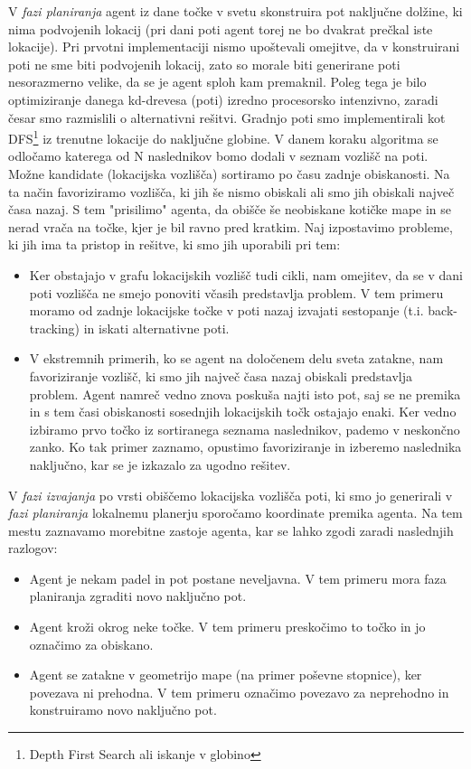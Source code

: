 \documentclass[a4paper,10pt]{article}
\begin{document}
V \textit{fazi planiranja} agent iz dane točke v svetu skonstruira pot naključne dolžine, ki nima podvojenih lokacij (pri dani poti agent torej ne bo dvakrat prečkal iste lokacije). Pri prvotni implementaciji nismo upoštevali omejitve, da v konstruirani poti ne sme biti podvojenih lokacij, zato so morale biti generirane poti nesorazmerno velike, da se je agent sploh kam premaknil. Poleg tega je bilo optimiziranje danega kd-drevesa (poti) izredno procesorsko intenzivno, zaradi česar smo razmislili o alternativni rešitvi. Gradnjo poti smo implementirali kot DFS\footnote{Depth First Search ali iskanje v globino} iz trenutne lokacije do naključne globine. V danem koraku algoritma se odločamo katerega od N naslednikov bomo dodali v seznam vozlišč na poti. Možne kandidate (lokacijska vozlišča) sortiramo po času zadnje obiskanosti. Na ta način favoriziramo vozlišča, ki jih še nismo obiskali ali smo jih obiskali največ časa nazaj. S tem "prisilimo" agenta, da obišče še neobiskane kotičke mape in se nerad vrača na točke, kjer je bil ravno pred kratkim. Naj izpostavimo probleme, ki jih ima ta pristop in rešitve, ki smo jih uporabili pri tem:
\begin{itemize}
 \item Ker obstajajo v grafu lokacijskih vozlišč tudi cikli, nam omejitev, da se v dani poti vozlišča ne smejo ponoviti včasih predstavlja problem. V tem primeru moramo od zadnje lokacijske točke v poti nazaj izvajati sestopanje (t.i. back-tracking) in iskati alternativne poti.
 \item V ekstremnih primerih, ko se agent na določenem delu sveta zatakne, nam favoriziranje vozlišč, ki smo jih največ časa nazaj obiskali predstavlja problem. Agent namreč vedno znova poskuša najti isto pot, saj se ne premika in s tem časi obiskanosti sosednjih lokacijskih točk ostajajo enaki. Ker vedno izbiramo prvo točko iz sortiranega seznama naslednikov, pademo v neskončno zanko. Ko tak primer zaznamo, opustimo favoriziranje in izberemo naslednika naključno, kar se je izkazalo za ugodno rešitev.
\end{itemize}

V \textit{fazi izvajanja} po vrsti obiščemo lokacijska vozlišča poti, ki smo jo generirali v \textit{fazi planiranja} lokalnemu planerju sporočamo koordinate premika agenta. Na tem mestu zaznavamo morebitne zastoje agenta, kar se lahko zgodi zaradi naslednjih razlogov:
\begin{itemize}
 \item Agent je nekam padel in pot postane neveljavna. V tem primeru mora faza planiranja zgraditi novo naključno pot.
 \item Agent kroži okrog neke točke. V tem primeru preskočimo to točko in jo označimo za obiskano.
 \item Agent se zatakne v geometrijo mape (na primer poševne stopnice), ker povezava ni prehodna. V tem primeru označimo povezavo za neprehodno in konstruiramo novo naključno pot.
\end{itemize}
\end{document}
